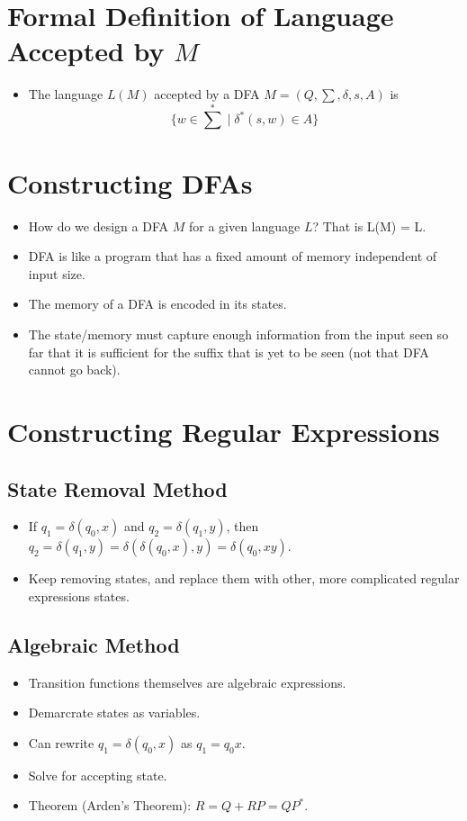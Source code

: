 \section{Formal Definition of Language Accepted by $M$}
\begin{itemize}
    \item The language $L(M)$ accepted by a DFA $M = (Q, \sum, \delta, s, A)$ is
    \begin{equation}
        \textstyle \{ w \in \sum^{\ast} \mid \delta^{\ast}(s, w) \in A \}
    \end{equation}
\end{itemize}

\section{Constructing DFAs}
\begin{itemize}
    \item How do we design a DFA $M$ for a given language $L$? That is L(M) = L.
    \item DFA is like a program that has a fixed amount of memory independent of input size.
    \item The memory of a DFA is encoded in its states.
    \item The state/memory must capture enough information from the input seen so far that it is sufficient for the suffix that is yet to be seen (not that DFA cannot go back).
\end{itemize}

\section{Constructing Regular Expressions}

\subsection{State Removal Method}
\begin{itemize}
    \item If $q_1 = \delta(q_0, x)$ and $q_2 = \delta(q_1, y)$, then $q_2 = \delta(q_1, y) = \delta(\delta(q_0, x), y) = \delta(q_0, xy)$.
    \item Keep removing states, and replace them with other, more complicated regular expressions states.
\end{itemize}

\subsection{Algebraic Method}
\begin{itemize}
    \item Transition functions themselves are algebraic expressions.
    \item Demarcrate states as variables.
    \item Can rewrite $q_1 = \delta(q_0, x)$ as $q_1 = q_0x$.
    \item Solve for accepting state.
    \item Theorem (Arden's Theorem): $R = Q + RP = QP^{\ast}$.
\end{itemize}

